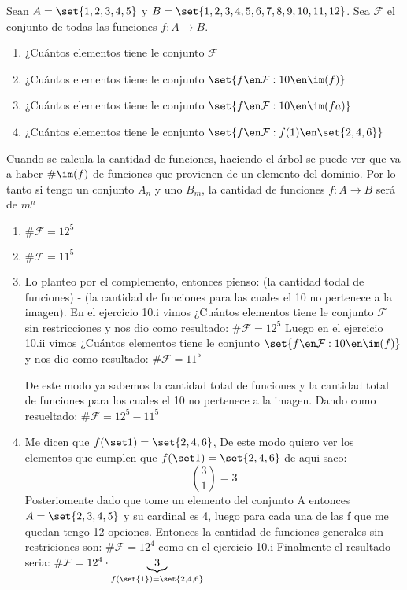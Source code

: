 \begin{enunciado}{\ejercicio}
  Sean $A = \set{1,2,3,4,5}$ y $B = \set{1,2,3,4,5,6,7,8,9,10,11,12}$. Sea $\mathcal F$ el conjunto de todas las funciones
  $f: A \to B$.
  \begin{enumerate}[label=\roman*)]
    \item  ¿Cuántos elementos tiene le conjunto $\mathcal F$
    \item  ¿Cuántos elementos tiene le conjunto $\set{f \en \mathcal F : 10 \en \im(f) }$
    \item  ¿Cuántos elementos tiene le conjunto $\set{f \en \mathcal F : 10 \en \im(fa)}$
    \item  ¿Cuántos elementos tiene le conjunto $\set{f \en \mathcal F : f(1) \en \set{2,4,6} }$
  \end{enumerate}
\end{enunciado}

Cuando se calcula la cantidad de funciones, haciendo el árbol se puede ver que va a haber
$\#\im(f)$ de funciones que provienen de un elemento del dominio.
Por lo tanto si tengo un conjunto $A_n$ y uno $B_m$, la cantidad de funciones $f : A \to B$ será
de $m^n$

\begin{enumerate}[label=\roman*)]
  \item $\# \mathcal F = 12^5$

  \item $\# \mathcal F = 11^5$

  \item Lo planteo por el complemento, entonces pienso: (la cantidad todal de funciones) - (la cantidad de funciones para las cuales el 10 no pertenece a la imagen).
        En el ejercicio 10.i vimos ¿Cuántos elementos tiene le conjunto $\mathcal F$ sin restricciones y nos dio como resultado: $\# \mathcal F = 12^5$
        Luego en el ejercicio 10.ii vimos ¿Cuántos elementos tiene le conjunto $\set{f \en \mathcal F : 10 \en \im(f) }$ y nos dio como resultado: $\# \mathcal F = 11^5$

        De este modo ya sabemos la cantidad total de funciones y la cantidad total de funciones para los cuales el 10 no pertenece a la imagen. Dando como resueltado:
        $\# \mathcal F = 12^5 - 11^5$

  \item Me dicen que $f(\set1) = \set{2,4,6}$,
        De este modo quiero ver los elementos que cumplen que $f(\set1) = \set{2,4,6}$ de aqui saco:
        $$
          \binom{3}{1} = 3
        $$
        Posteriomente dado que tome un elemento del conjunto A entonces $A = \set{2,3,4,5}$ y su cardinal es 4, luego para cada una de las f que me quedan tengo 12 opciones.
        Entonces la cantidad de funciones generales sin restriciones son:  $\# \mathcal F = 12^4$ como en el ejercicio 10.i
        Finalmente el resultado seria:
        $\# \mathcal F = 12^4 \cdot \underbrace{\tiny 3}_{ f (\set{1})= \set{2,4,6}}$
\end{enumerate}
